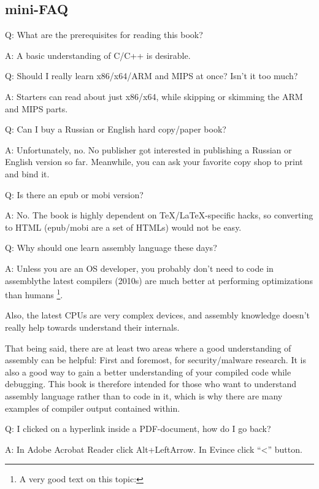 \subsection*{mini-FAQ}

\par Q: What are the prerequisites for reading this book?
\par A: A basic understanding of C/C++ is desirable.

\par Q: Should I really learn x86/x64/ARM and MIPS at once? Isn't it too much?
\par A: Starters can read about just x86/x64, while skipping or skimming the ARM and MIPS parts.

\par Q: Can I buy a Russian or English hard copy/paper book?
\par A: Unfortunately, no. No publisher got interested in publishing a Russian or English version so far.
Meanwhile, you can ask your favorite copy shop to print and bind it.

\par Q: Is there an epub or mobi version?
\par A: No. The book is highly dependent on TeX/LaTeX-specific hacks, so converting to HTML (epub/mobi are a set of HTMLs)
would not be easy.

\par Q: Why should one learn assembly language these days?
\par A: Unless you are an \ac{OS} developer, you probably don't need to code in assembly\textemdash{}the latest compilers (2010s) are much better at performing optimizations than humans \footnote{A very good text on this topic: \InSqBrackets{\AgnerFog}}.

Also, the latest \ac{CPU}s are very complex devices, and assembly knowledge doesn't really help towards understand their internals.

That being said, there are at least two areas where a good understanding of assembly can be helpful:
First and foremost, for security/malware research. It is also a good way to gain a better understanding of your compiled code while debugging.
This book is therefore intended for those who want to understand assembly language rather
than to code in it, which is why there are many examples of compiler output contained within.

\par Q: I clicked on a hyperlink inside a PDF-document, how do I go back?
\par A: In Adobe Acrobat Reader click Alt+LeftArrow. In Evince click ``<'' button.

